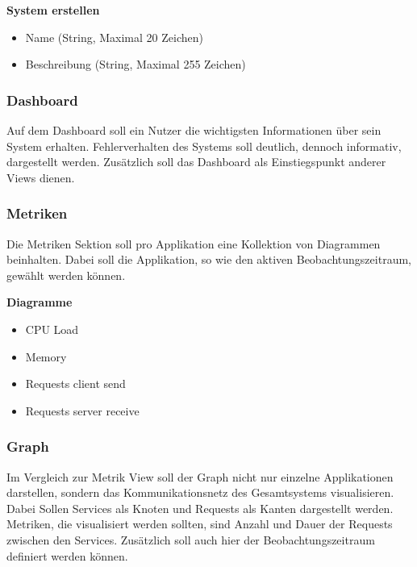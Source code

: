 \vspace{1cm}
\textbf{System erstellen}

\begin{itemize}
\item Name (String, Maximal 20 Zeichen)
\item Beschreibung (String, Maximal 255 Zeichen)
\end{itemize}

\vspace{1cm}

\subsubsection{Dashboard}

Auf dem Dashboard soll ein Nutzer die wichtigsten Informationen über sein System erhalten.
Fehlerverhalten des Systems soll deutlich, dennoch informativ, dargestellt werden.
Zusätzlich soll das Dashboard als Einstiegspunkt anderer Views dienen.

\subsubsection{Metriken}

Die Metriken Sektion soll pro Applikation eine Kollektion von Diagrammen beinhalten.
Dabei soll die Applikation, so wie den aktiven Beobachtungszeitraum, gewählt werden können.

\vspace{1cm}
\textbf{Diagramme}

\begin{itemize}
\item CPU Load
\item Memory
\item Requests client send
\item Requests server receive
\end{itemize}

\vspace{1cm}

\subsubsection{Graph}

Im Vergleich zur Metrik View soll der Graph nicht nur einzelne Applikationen darstellen,
sondern das Kommunikationsnetz des Gesamtsystems visualisieren.
Dabei Sollen Services als Knoten und Requests als Kanten dargestellt werden.
Metriken, die visualisiert werden sollten, sind Anzahl und Dauer der Requests zwischen den Services.
Zusätzlich soll auch hier der Beobachtungszeitraum definiert werden können.

